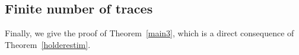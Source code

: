 \documentclass[12pt]{article}
\theoremstyle{definition}
\theoremstyle{remark}
\numberwithin{equation}{section}
\DeclareMathOperator{\dist}{dist}
\newcommand{\dd}{\partial}
\begin{document}


\subsection{Finite number of traces}
\label{SubsectionTraces}

Finally, we give the proof of Theorem~\ref{main3}, which is a direct consequence of Theorem~\ref{holderestim}.
\end{document}
